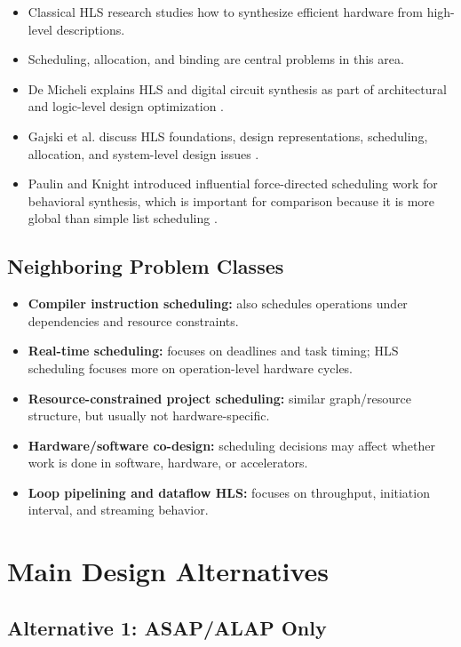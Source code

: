 \documentclass[11pt,a4paper]{article}
\begin{document}
\begin{itemize}[leftmargin=*]
    \item Classical HLS research studies how to synthesize efficient hardware from high-level descriptions.
    \item Scheduling, allocation, and binding are central problems in this area.
    \item De Micheli explains HLS and digital circuit synthesis as part of architectural and logic-level design optimization \cite{DeMicheli1994}.
    \item Gajski et al. discuss HLS foundations, design representations, scheduling, allocation, and system-level design issues \cite{Gajski1992}.
    \item Paulin and Knight introduced influential force-directed scheduling work for behavioral synthesis, which is important for comparison because it is more global than simple list scheduling \cite{PaulinKnight1989}.
\end{itemize}

\subsection*{Neighboring Problem Classes}

\begin{itemize}[leftmargin=*]
    \item \textbf{Compiler instruction scheduling:} also schedules operations under dependencies and resource constraints.
    \item \textbf{Real-time scheduling:} focuses on deadlines and task timing; HLS scheduling focuses more on operation-level hardware cycles.
    \item \textbf{Resource-constrained project scheduling:} similar graph/resource structure, but usually not hardware-specific.
    \item \textbf{Hardware/software co-design:} scheduling decisions may affect whether work is done in software, hardware, or accelerators.
    \item \textbf{Loop pipelining and dataflow HLS:} focuses on throughput, initiation interval, and streaming behavior.
\end{itemize}

\section{Main Design Alternatives}

\subsection*{Alternative 1: ASAP/ALAP Only}
\end{document}
